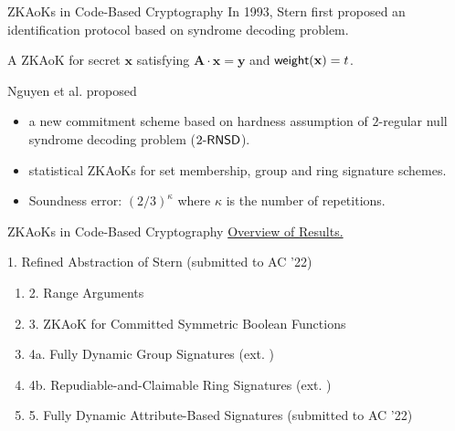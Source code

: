 \begin{frame}{ZKAoKs in Code-Based Cryptography}
	In 1993, Stern first proposed an identification protocol \cite{Stern93} based on syndrome decoding problem.\pause
	
	A ZKAoK for secret $\mathbf{x}$ satisfying $\mathbf{A}\cdot\mathbf{x} = \mathbf{y}$ and $\mathsf{weight}(\mathbf{x}) = t$. \pause
	
	Nguyen et al. \cite{NguyenTWZ19, NguyenTWZ19eprint} proposed \pause
	\begin{itemize}
		\item a new commitment scheme based on hardness assumption of $2$-regular null syndrome decoding problem (${2\textsf{-}\mathsf{RNSD}}$).\pause
		\item statistical ZKAoKs for set membership, group and ring signature schemes.\pause 
		\item Soundness error: $(2/3)^\kappa$ where $\kappa$ is the number of repetitions.
	\end{itemize}
\end{frame}

\begin{frame}{ZKAoKs in Code-Based Cryptography}
	\underline{Overview of Results.}\pause
	
	{\small 1. Refined Abstraction of Stern (submitted to AC '22)}\pause
	\begin{enumerate}[$\Rightarrow$]
		\item {\small 2. Range Arguments \cite{NguyenTWZ19}}\pause
		\item {\small 3. ZKAoK for Committed Symmetric Boolean Functions \cite{LingNPTW21}}\pause
		\item {\small 4a. Fully Dynamic Group Signatures (ext. \cite{NguyenTWZ19})}\pause
		\item {\small 4b. Repudiable-and-Claimable Ring Signatures (ext. \cite{NguyenTWZ19})}\pause
		\item {\small 5. Fully Dynamic Attribute-Based Signatures (submitted to AC '22)}
	\end{enumerate}
\end{frame}